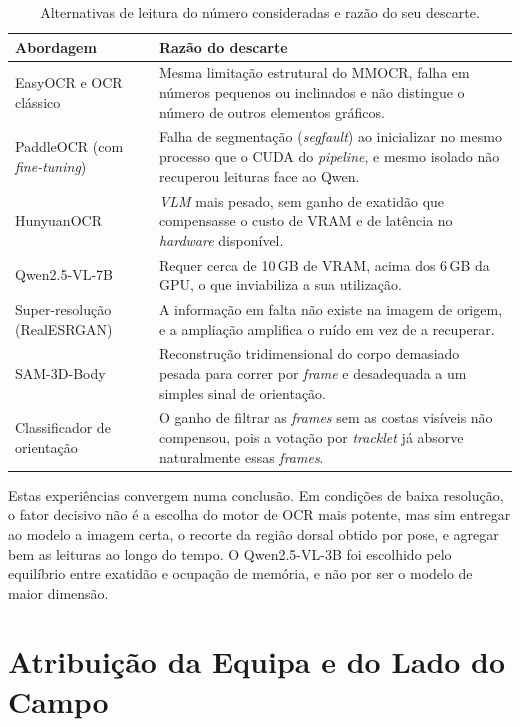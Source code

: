 \begin{table}[htbp]
\centering
\caption{Alternativas de leitura do número consideradas e razão do seu descarte.}
\label{tab:alternativas}
\renewcommand{\arraystretch}{1.35}
\setlength{\tabcolsep}{6pt}
\begin{tabular}{|p{3.6cm}|p{9.0cm}|}
\hline
\textbf{Abordagem} & \textbf{Razão do descarte} \\
\hline
EasyOCR e OCR clássico &
Mesma limitação estrutural do MMOCR, falha em números pequenos ou inclinados e não
distingue o número de outros elementos gráficos. \\
\hline
PaddleOCR (com \emph{fine-tuning}) &
Falha de segmentação (\emph{segfault}) ao inicializar no mesmo processo que o CUDA do
\emph{pipeline}, e mesmo isolado não recuperou leituras face ao Qwen. \\
\hline
HunyuanOCR &
\emph{VLM} mais pesado, sem ganho de exatidão que compensasse o custo de VRAM e de
latência no \emph{hardware} disponível. \\
\hline
Qwen2.5-VL-7B &
Requer cerca de 10\,GB de VRAM, acima dos 6\,GB da GPU, o que inviabiliza a sua
utilização. \\
\hline
Super-resolução (\mbox{RealESRGAN}) &
A informação em falta não existe na imagem de origem, e a ampliação amplifica o ruído
em vez de a recuperar. \\
\hline
SAM-3D-Body &
Reconstrução tridimensional do corpo demasiado pesada para correr por \emph{frame} e
desadequada a um simples sinal de orientação. \\
\hline
Classificador de orientação &
O ganho de filtrar as \emph{frames} sem as costas visíveis não compensou, pois a votação
por \emph{tracklet} já absorve naturalmente essas \emph{frames}. \\
\hline
\end{tabular}
\end{table}


Estas experiências convergem numa conclusão. Em condições de baixa resolução, o fator decisivo não é
a escolha do motor de OCR mais potente, mas sim entregar ao modelo a imagem certa, o recorte da
região dorsal obtido por pose, e agregar bem as leituras ao longo do tempo. O Qwen2.5-VL-3B foi
escolhido pelo equilíbrio entre exatidão e ocupação de memória, e não por ser o modelo de maior
dimensão.

\section{Atribuição da Equipa e do Lado do Campo}\label{sec:met-equipa}

